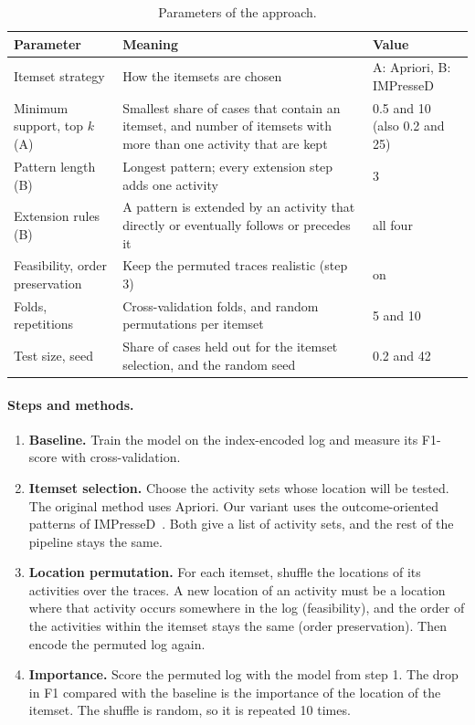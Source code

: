 \documentclass{article}
\begin{document}
\begin{table}[H]
    \centering
    \caption{Parameters of the approach.}
    \label{tab:parameters}
    \small
    \begin{tabular}{@{}p{3.3cm}p{8.3cm}p{3.2cm}@{}}
        \toprule
        Parameter & Meaning & Value \\
        \midrule
        Itemset strategy & How the itemsets are chosen & A: Apriori, B: IMPresseD \\
        Minimum support, top $k$ (A) & Smallest share of cases that contain an itemset, and number of itemsets with more than one activity that are kept & 0.5 and 10 (also 0.2 and 25) \\
        Pattern length (B) & Longest pattern; every extension step adds one activity & 3 \\
        Extension rules (B) & A pattern is extended by an activity that directly or eventually follows or precedes it & all four \\
        Feasibility, order preservation & Keep the permuted traces realistic (step 3) & on \\
        Folds, repetitions & Cross-validation folds, and random permutations per itemset & 5 and 10 \\
        Test size, seed & Share of cases held out for the itemset selection, and the random seed & 0.2 and 42 \\
        \bottomrule
    \end{tabular}
\end{table}

\paragraph{Steps and methods.}
\begin{enumerate}
    \item \textbf{Baseline.} Train the model on the index-encoded log and measure its F1-score with cross-validation.
    \item \textbf{Itemset selection.} Choose the activity sets whose location will be tested. The original method uses Apriori. Our variant uses the outcome-oriented patterns of IMPresseD~\cite{vazifehdoostirani2023}. Both give a list of activity sets, and the rest of the pipeline stays the same.
    \item \textbf{Location permutation.} For each itemset, shuffle the locations of its activities over the traces. A new location of an activity must be a location where that activity occurs somewhere in the log (feasibility), and the order of the activities within the itemset stays the same (order preservation). Then encode the permuted log again.
    \item \textbf{Importance.} Score the permuted log with the model from step 1. The drop in F1 compared with the baseline is the importance of the location of the itemset. The shuffle is random, so it is repeated 10 times.
\end{enumerate}
\end{document}
